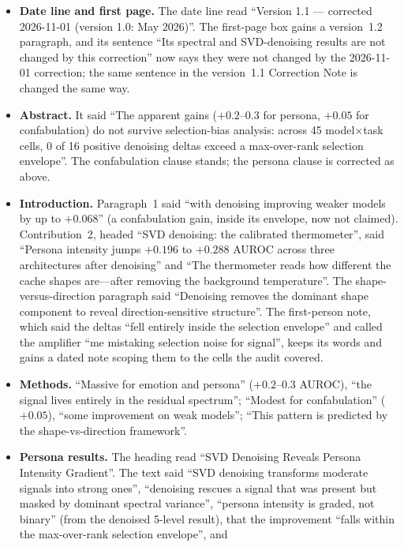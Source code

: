 \documentclass[11pt,a4paper]{article}
\begin{document}
\begin{itemize}[nosep]
\item \textbf{Date line and first page.} The date line read ``Version 1.1
  --- corrected 2026-11-01 (version 1.0: May 2026)''. The first-page box
  gains a version~1.2 paragraph, and its sentence ``Its spectral and
  SVD-denoising results are not changed by this correction'' now says they
  were not changed by the 2026-11-01 correction; the same sentence in the
  version~1.1 Correction Note is changed the same way.
\item \textbf{Abstract.} It said ``The apparent gains ($+0.2$--$0.3$ for
  persona, $+0.05$ for confabulation) do not survive selection-bias
  analysis: across 45 model$\times$task cells, 0 of 16 positive denoising
  deltas exceed a max-over-rank selection envelope''. The confabulation
  clause stands; the persona clause is corrected as above.
\item \textbf{Introduction.} Paragraph~1 said ``with denoising improving
  weaker models by up to $+0.068$'' (a confabulation gain, inside its
  envelope, now not claimed). Contribution~2, headed ``SVD denoising: the
  calibrated thermometer'', said ``Persona intensity jumps $+0.196$ to
  $+0.288$ AUROC across three architectures after denoising'' and ``The
  thermometer reads how different the cache shapes are---after removing the
  background temperature''. The shape-versus-direction paragraph said
  ``Denoising removes the dominant shape component to reveal
  direction-sensitive structure''. The first-person note, which said the
  deltas ``fell entirely inside the selection envelope'' and called the
  amplifier ``me mistaking selection noise for signal'', keeps its words and
  gains a dated note scoping them to the cells the audit covered.
\item \textbf{Methods.} ``Massive for emotion and persona'' ($+0.2$--$0.3$
  AUROC), ``the signal lives entirely in the residual spectrum''; ``Modest
  for confabulation'' ($+0.05$), ``some improvement on weak models''; ``This
  pattern is predicted by the shape-vs-direction framework''.
\item \textbf{Persona results.} The heading read ``SVD Denoising Reveals
  Persona Intensity Gradient''. The text said ``SVD denoising transforms
  moderate signals into strong ones'', ``denoising rescues a signal that was
  present but masked by dominant spectral variance'', ``persona intensity is
  graded, not binary'' (from the denoised 5-level result), that the
  improvement ``falls within the max-over-rank selection envelope'', and

\end{itemize}
\end{document}
